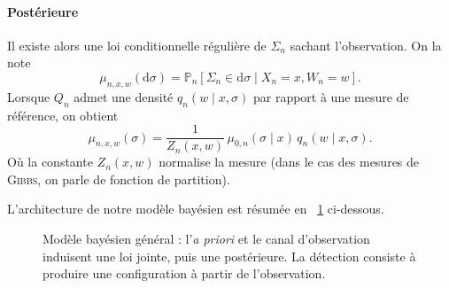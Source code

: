 \paragraph{Postérieure}
Il existe alors une loi conditionnelle régulière de $\Sigma_n$ sachant l'observation. On la note
\begin{equation}
    \mu_{n,x,w}(\mathrm d\sigma)
    =
    \mathbb P_n\left[\Sigma_n\in\mathrm d\sigma\mid X_n=x,W_n=w\right].
    \label{eq:chapII_posterieure_def}
\end{equation}
Lorsque $Q_n$ admet une densité $q_n(w\mid x,\sigma)$ par rapport à une mesure de référence, on obtient
\begin{equation}
    \mu_{n,x,w}(\sigma)
    =
    \frac{1}{Z_n(x,w)}\,
    \mu_{0,n}(\sigma\mid x)\,q_n(w\mid x,\sigma).
    \label{eq:chapII_posterieure_densite}
\end{equation}
Où la constante $Z_n(x,w)$ normalise la mesure (dans le cas des mesures de \textsc{Gibbs}, on parle de fonction de partition).

L'architecture de notre modèle bayésien est résumée en \Fig~\ref{fig:chapII_modele_bayesien} ci-dessous.

\begin{figure}[H]
\centering
{}
\caption{Modèle bayésien général : l'\emph{a priori} et le canal d'observation induisent une loi jointe, puis une postérieure. La détection consiste à produire une configuration à partir de l'observation.}
\label{fig:chapII_modele_bayesien}
\end{figure}

